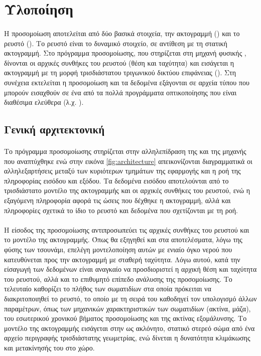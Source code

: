 \section{Υλοποίηση}

\paragraph{} Η προσομοίωση αποτελείται από δύο βασικά στοιχεία, την ακτογραμμή
() και το ρευστό (). Το ρευστό είναι το δυναμικό στοιχείο, σε
αντίθεση με τη στατική ακτογραμμή. Στο πρόγραμμα προσομοίωσης, που στηρίζεται στη μηχανή
φυσικής , δίνονται οι αρχικές συνθήκες του ρευστού (θέση και ταχύτητα) και
εισάγεται η ακτογραμμή με τη μορφή τρισδιάστατου τριγωνικού δικτύου επιφάνειας
(). Στη συνέχεια εκτελείται η προσομοίωση και τα δεδομένα
εξάγονται σε αρχεία τύπου  που μπορούν εισαχθούν σε ένα από τα πολλά προγράμματα
οπτικοποίησης που είναι διαθέσιμα ελεύθερα (λ.χ. ).

\subsection{Γενική αρχιτεκτονική}
\paragraph{} Το πρόγραμμα προσομοίωσης στηρίζεται στην αλληλεπίδραση της  και
της μηχανής  που αναπτύχθηκε ενώ στην εικόνα \ref{fig:architecture}
απεικονίζονται διαγραμματικά οι αλληλεξαρτήσεις μεταξύ των κυριότερων τμημάτων της
εφαρμογής και η ροή της πληροφορίας εισόδου και εξόδου. Τα δεδομένα εισόδου αποτελούνται
από το τρισδιάστατο μοντέλο της ακτογραμμής και οι αρχικές συνθήκες του ρευστού, ενώ η
εξαγόμενη πληροφορία αφορά τις ώσεις που δέχθηκε η ακτογραμμή, αλλά και πληροφορίες
σχετικά το ίδιο το ρευστό και δεδομένα που σχετίζονται με τη ροή.

\paragraph{} Η είσοδος της προσομοίωσης αντιπροσωπεύει τις αρχικές συνθήκες του ρευστού
και το μοντέλο της ακτογραμμής. Όπως θα εξηγηθεί και στα αποτελέσματα, λόγω της φύσης των
τσουνάμι, επελέγη μοντελοποίηση αυτών με ενιαίο όγκο νερού που κατευθύνεται προς την
ακτογραμμή με σταθερή ταχύτητα. Λόγω αυτού, κατά την είσαγωγή των δεδομένων είναι αναγκαίο
να προσδιοριστεί η αρχική θέση και ταχύτητα του ρευστού, αλλά και το επιθυμητό επίπεδο
ανάλυσης της προσομοίωσης. Το τελευταίο καθορίζει το πλήθος των σωματιδίων στα οποία
πρόκειται να διακριτοποιηθεί το ρευστό, το οποίο με τη σειρά του καθοδηγεί τον υπολογισμό
άλλων παραμέτρων, όπως των μηχανικών χαρακτηριστικών των σωματιδίων (ακτίνα, μάζα), του
εσωτερικού χρονικού βήματος προσομοίωσης και της ακτίνας εξομάλυνσης. Το μοντέλο της
ακτογραμμής εισάγεται στην  ως ακλόνητο, στατικό στερεό σώμα από ένα αρχείο
περιγραφής τρισδιάστατης γεωμετρίας, ενώ δίνεται η δυνατότητα κλιμάκωσης και μετακίνησής
του στο χώρο.


